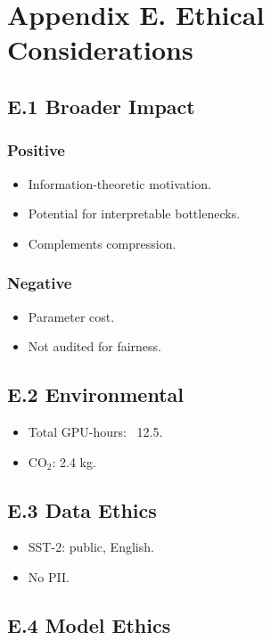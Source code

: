\section{Appendix E. Ethical Considerations}

\subsection{E.1 Broader Impact}

\subsubsection{Positive}
\begin{itemize}
\item Information-theoretic motivation.
\item Potential for interpretable bottlenecks.
\item Complements compression.

\end{itemize}
\subsubsection{Negative}
\begin{itemize}
\item Parameter cost.
\item Not audited for fairness.

\end{itemize}
\subsection{E.2 Environmental}

\begin{itemize}
\item Total GPU-hours: ~12.5.
\item CO$_2$: 2.4 kg.

\end{itemize}
\subsection{E.3 Data Ethics}

\begin{itemize}
\item SST-2: public, English.
\item No PII.

\end{itemize}
\subsection{E.4 Model Ethics}

